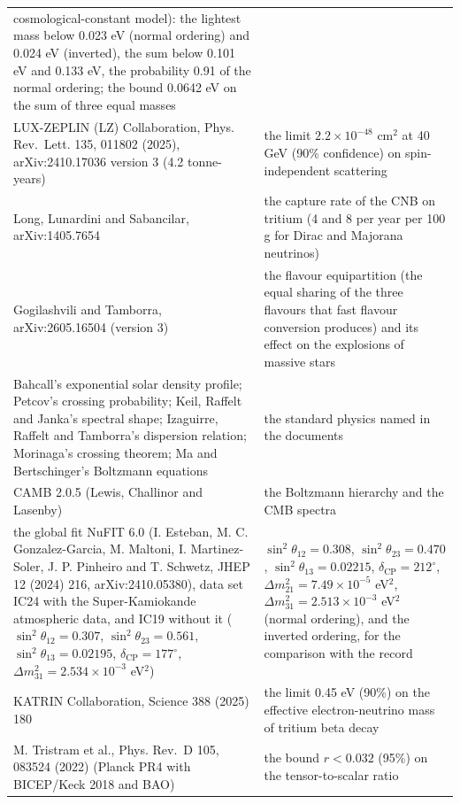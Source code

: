 \documentclass[
  10pt,
]{article}
\begin{document}
\begin{longtable}[]{@{}
  >{\raggedright\arraybackslash}p{}
  >{\raggedright\arraybackslash}p{}@{}}
cosmological-constant model): the lightest mass below 0.023 eV (normal
ordering) and 0.024 eV (inverted), the sum below 0.101 eV and 0.133 eV,
the probability 0.91 of the normal ordering; the bound 0.0642 eV on the
sum of three equal masses \\
LUX-ZEPLIN (LZ) Collaboration, Phys. Rev.~Lett. 135, 011802 (2025),
arXiv:2410.17036 version 3 (4.2 tonne-years) & the limit
\(2.2\times10^{-48}\) cm\(^2\) at 40 GeV (90\% confidence) on
spin-independent scattering \\
Long, Lunardini and Sabancilar, arXiv:1405.7654 & the capture rate of
the CNB on tritium (4 and 8 per year per 100 g for Dirac and Majorana
neutrinos) \\
Gogilashvili and Tamborra, arXiv:2605.16504 (version 3) & the flavour
equipartition (the equal sharing of the three flavours that fast flavour
conversion produces) and its effect on the explosions of massive
stars \\
Bahcall's exponential solar density profile; Petcov's crossing
probability; Keil, Raffelt and Janka's spectral shape; Izaguirre,
Raffelt and Tamborra's dispersion relation; Morinaga's crossing theorem;
Ma and Bertschinger's Boltzmann equations & the standard physics named
in the documents \\
CAMB 2.0.5 (Lewis, Challinor and Lasenby) & the Boltzmann hierarchy and
the CMB spectra \\
the global fit NuFIT 6.0 (I. Esteban, M. C. Gonzalez-Garcia, M. Maltoni,
I. Martinez-Soler, J. P. Pinheiro and T. Schwetz, JHEP 12 (2024) 216,
arXiv:2410.05380), data set IC24 with the Super-Kamiokande atmospheric
data, and IC19 without it (\(\sin^2\theta_{12} = 0.307\),
\(\sin^2\theta_{23} = 0.561\), \(\sin^2\theta_{13} = 0.02195\),
\(\delta_{\mathrm{CP}} = 177^\circ\),
\(\Delta m^2_{31} = 2.534\times10^{-3}\) eV\(^2\)) &
\(\sin^2\theta_{12} = 0.308\), \(\sin^2\theta_{23} = 0.470\),
\(\sin^2\theta_{13} = 0.02215\), \(\delta_{\mathrm{CP}} = 212^\circ\),
\(\Delta m^2_{21} = 7.49\times10^{-5}\) eV\(^2\),
\(\Delta m^2_{31} = 2.513\times10^{-3}\) eV\(^2\) (normal ordering), and
the inverted ordering, for the comparison with the record \\
KATRIN Collaboration, Science 388 (2025) 180 & the limit 0.45 eV (90\%)
on the effective electron-neutrino mass of tritium beta decay \\
M. Tristram et al., Phys. Rev.~D 105, 083524 (2022) (Planck PR4 with
BICEP/Keck 2018 and BAO) & the bound \(r < 0.032\) (95\%) on the
tensor-to-scalar ratio \\

\end{longtable}
\end{document}

